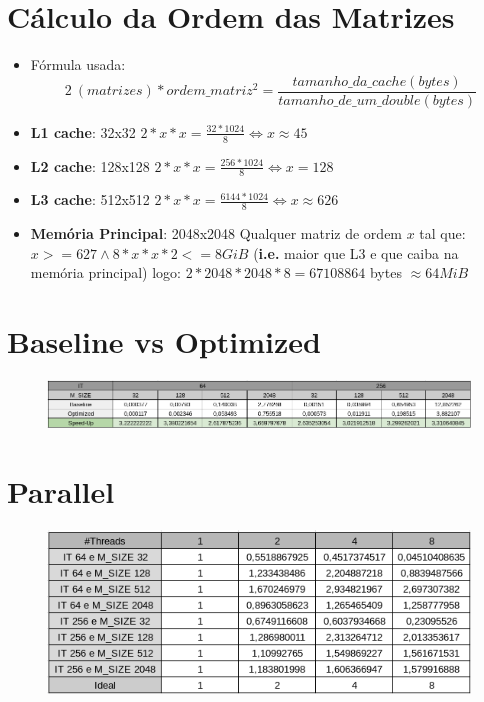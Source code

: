 \documentclass{article}
\begin{document}
\begin{appendices}

\section{Cálculo da Ordem das Matrizes} \label{calOrdem}
\begin{itemize}
    \item Fórmula usada: 
    \begin{equation}
    2\ (matrizes) * ordem\_matriz^{2} = \frac{tamanho\_da\_cache(bytes)}{tamanho\_de\_um\_double(bytes)}
    \end{equation}
    \item \textbf{L1 cache}: 32x32 \newline
        $ 2 * x * x = \frac{32*1024}{8} \Leftrightarrow x \approx 45 $
    \item \textbf{L2 cache}: 128x128 \newline
        $ 2 * x * x = \frac{256*1024}{8} \Leftrightarrow x = 128 $
    \item \textbf{L3 cache}: 512x512 \newline
        $ 2 * x * x = \frac{6144*1024}{8} \Leftrightarrow x \approx 626 $
    \item \textbf{Memória Principal}: 2048x2048 \newline 
        Qualquer matriz de ordem $x$ tal que: \newline $x >= 627 \land 8*x*x*2 <= 8GiB$ \newline (\textbf{i.e.} maior que L3 e que caiba na memória principal) logo: 
        \newline $2*2048*2048*8 = 67108864$ bytes $ \approx 64 MiB$

\end{itemize} 

\section{Baseline vs Optimized} \label{baseVSopt}
\begin{figure}[H]
    \centering
    \includegraphics[width=17cm]{Pictures/baseVSopt.png}
\end{figure}

\section{Parallel} \label{parallel}
\begin{figure}[H]
    \centering
    \includegraphics[width=15cm]{Pictures/parallel.png}
\end{figure}

\end{appendices}
\end{document}
